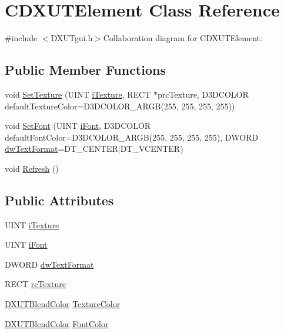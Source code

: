 \hypertarget{class_c_d_x_u_t_element}{
\section{CDXUTElement Class Reference}
\label{class_c_d_x_u_t_element}
}


{\ttfamily \#include $<$DXUTgui.h$>$}Collaboration diagram for CDXUTElement:\subsection*{Public Member Functions}
\begin{DoxyCompactItemize}
\item 
void \hyperlink{class_c_d_x_u_t_element_ac12fafe3f0d7f946298f4cd7b7a85800}{SetTexture} (UINT \hyperlink{class_c_d_x_u_t_element_a1e79d31003ef5a165cdf4a6fe456840b}{iTexture}, RECT $\ast$prcTexture, D3DCOLOR defaultTextureColor=D3DCOLOR\_\-ARGB(255, 255, 255, 255))
\item 
void \hyperlink{class_c_d_x_u_t_element_a34b6abc34f58b0378e2b1030c0f1f674}{SetFont} (UINT \hyperlink{class_c_d_x_u_t_element_a7f492bcce7116c2fc933a9e7be0b4f1a}{iFont}, D3DCOLOR defaultFontColor=D3DCOLOR\_\-ARGB(255, 255, 255, 255), DWORD \hyperlink{class_c_d_x_u_t_element_a5b22f735f51c0380731339c611ec3a21}{dwTextFormat}=DT\_\-CENTER$|$DT\_\-VCENTER)
\item 
void \hyperlink{class_c_d_x_u_t_element_a835872a666a7a38f13a02a74090d5003}{Refresh} ()
\end{DoxyCompactItemize}
\subsection*{Public Attributes}
\begin{DoxyCompactItemize}
\item 
UINT \hyperlink{class_c_d_x_u_t_element_a1e79d31003ef5a165cdf4a6fe456840b}{iTexture}
\item 
UINT \hyperlink{class_c_d_x_u_t_element_a7f492bcce7116c2fc933a9e7be0b4f1a}{iFont}
\item 
DWORD \hyperlink{class_c_d_x_u_t_element_a5b22f735f51c0380731339c611ec3a21}{dwTextFormat}
\item 
RECT \hyperlink{class_c_d_x_u_t_element_a3f74c622496396f35eff3fe9e332014d}{rcTexture}
\item 
\hyperlink{struct_d_x_u_t_blend_color}{DXUTBlendColor} \hyperlink{class_c_d_x_u_t_element_a52129b00dee0564016627a7a22a41f02}{TextureColor}
\item 
\hyperlink{struct_d_x_u_t_blend_color}{DXUTBlendColor} \hyperlink{class_c_d_x_u_t_element_ac853da0ce0830e80e5ec969c89762079}{FontColor}
\end{DoxyCompactItemize}


